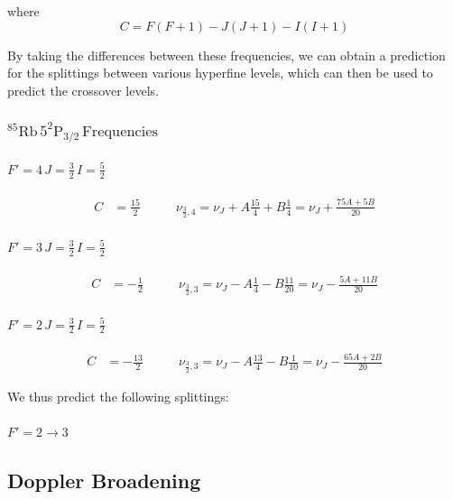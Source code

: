 \documentclass[12pt]{article}
\begin{document}
where
$$C = F(F+1) - J(J+1) - I(I+1)$$

By taking the differences between these frequencies, we can obtain a prediction for the splittings between various hyperfine levels, which can then be used to predict the crossover levels.

\subsubsection*{${}^{85}\text{Rb}\,5^2\text{P}_{3/2}\,\text{Frequencies}$}

\paragraph{$F' = 4\, J = \frac{3}{2}\, I = \frac{5}{2}$}
\begin{align*}
C &= \frac{15}{2}\qquad
&\nu_{\frac{3}{2},4} = \nu_J + A \frac{15}{4} + B\frac{1}{4}= \nu_J +  \frac{75A+5B}{20}
\end{align*}

\paragraph{$F' = 3\, J = \frac{3}{2}\, I = \frac{5}{2}$}
\begin{align*}
	C &= -\frac{1}{2}\qquad
	&\nu_{\frac{3}{2},3} = \nu_J - A \frac{1}{4} - B\frac{11}{20}= \nu_J - \frac{5A+11B}{20}
\end{align*}

\paragraph{$F' = 2\, J = \frac{3}{2}\, I = \frac{5}{2}$}
\begin{align*}
	C &= -\frac{13}{2}\qquad
	&\nu_{\frac{3}{2},3} = \nu_J - A \frac{13}{4} - B\frac{1}{10} = \nu_J - \frac{65A+2B}{20}
\end{align*}

We thus predict the following splittings:
\paragraph{$F' = 2 \rightarrow 3$}

\subsection*{Doppler Broadening}
\end{document}
